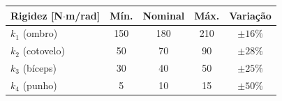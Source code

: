 \footnotesize
\begin{tabular}{l c c c c}
    \toprule
    Rigidez [N$\cdot$m/rad] & Mín. & Nominal & Máx. & Variação \\
    \midrule
    $k_1$ (ombro)    & 150 & 180 & 210 & $\pm16\%$ \\
    $k_2$ (cotovelo) & 50  & 70  & 90  & $\pm28\%$ \\
    $k_3$ (bíceps)   & 30  & 40  & 50  & $\pm25\%$ \\
    $k_4$ (punho)    & 5   & 10  & 15  & $\pm50\%$ \\
    \bottomrule
\end{tabular}
